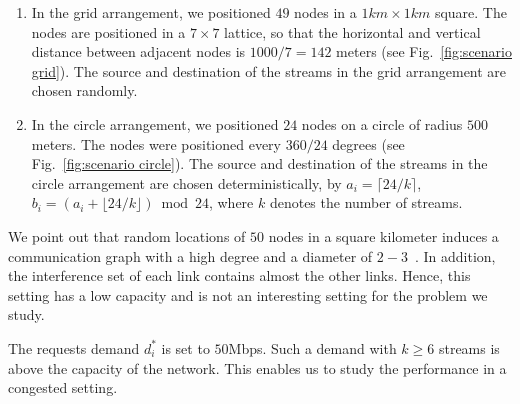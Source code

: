 \documentclass[12pt]{article}
\newenvironment{proof sketch}[1]{\noindent {\emph{Proof sketch of #1:}}}{\hfill \qed}
\begin{document}
\begin{enumerate}
\item In the grid arrangement, we positioned $49$ nodes in a
  $1km\times 1km$ square. The nodes are positioned in a $7\times 7$
  lattice, so that the horizontal and vertical distance between
  adjacent nodes is $1000/7=142$ meters (see Fig.~\ref{fig:scenario
    grid}).    The source and destination of the streams
  in the grid arrangement are chosen randomly.

\item In the circle arrangement, we positioned $24$ nodes on a circle
  of radius $500$ meters.  The nodes were positioned every $360/24$
  degrees (see Fig.~\ref{fig:scenario circle}). The source and
  destination of the streams in the circle arrangement are chosen
  deterministically, by $a_i=\lceil 24/k \rceil$, $b_i=(a_i + \lfloor
  24/k \rfloor) \bmod 24$, where $k$ denotes the number of streams.
\end{enumerate}

We point out that random locations of $50$ nodes in a square kilometer
induces a communication graph with a high degree and a diameter of
$2-3$~\cite{marina2010topology}. In addition, the interference set of
each link contains almost the other links. Hence, this setting has a
low capacity and is not an interesting setting for the problem we
study.

The requests demand $d^*_i$ is set to $50$Mbps. Such a demand with
$k\geq 6$ streams is above the capacity of the network. This enables
us to study the performance in a congested setting.
\end{document}
